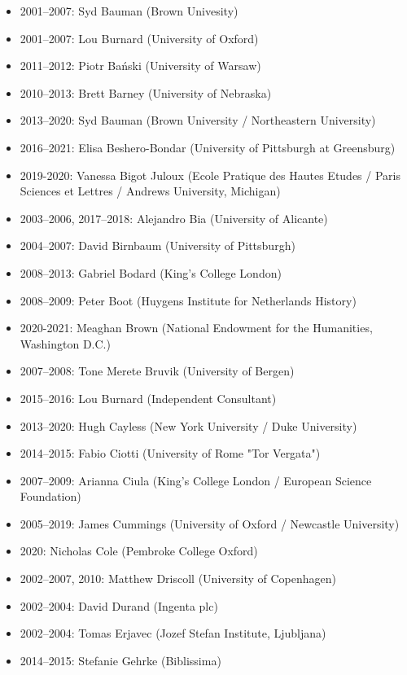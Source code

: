 \begin{itemize}
\item 2001–2007: Syd Bauman (Brown Univesity)
\item 2001–2007: Lou Burnard (University of Oxford)
\end{itemize}   \begin{itemize}
\item 2011–2012: Piotr Bański (University of Warsaw)
\item 2010–2013: Brett Barney (University of Nebraska)
\item 2013–2020: Syd Bauman (Brown University / Northeastern University)
\item 2016–2021: Elisa Beshero-Bondar (University of Pittsburgh at Greensburg)
\item 2019-2020: Vanessa Bigot Juloux (Ecole Pratique des Hautes Etudes / Paris Sciences et Lettres / Andrews University, Michigan)
\item 2003–2006, 2017–2018: Alejandro Bia (University of Alicante) 
\item 2004–2007: David Birnbaum (University of Pittsburgh)
\item 2008–2013: Gabriel Bodard (King's College London)
\item 2008–2009: Peter Boot (Huygens Institute for Netherlands History)
\item 2020-2021: Meaghan Brown (National Endowment for the Humanities, Washington D.C.)
\item 2007–2008: Tone Merete Bruvik (University of Bergen)
\item 2015–2016: Lou Burnard (Independent Consultant)
\item 2013–2020: Hugh Cayless (New York University / Duke University)
\item 2014–2015: Fabio Ciotti (University of Rome "Tor Vergata")
\item 2007–2009: Arianna Ciula (King's College London / European Science Foundation)
\item 2005–2019: James Cummings (University of Oxford / Newcastle University)
\item 2020: Nicholas Cole (Pembroke College Oxford)
\item 2002–2007, 2010: Matthew Driscoll (University of Copenhagen)
\item 2002–2004: David Durand (Ingenta plc)
\item 2002–2004: Tomas Erjavec (Jozef Stefan Institute, Ljubljana)
\item 2014–2015: Stefanie Gehrke (Biblissima)

\end{itemize}
